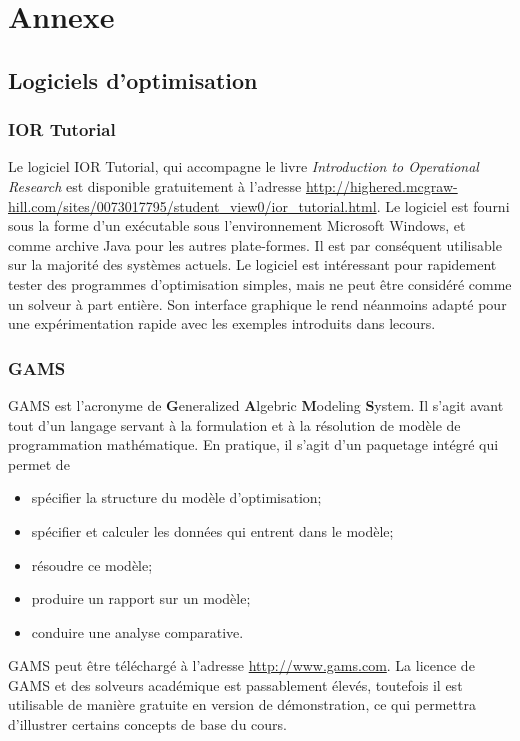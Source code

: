 \chapter{Annexe}

\section{Logiciels d'optimisation}

\subsection{IOR Tutorial}

Le logiciel IOR Tutorial, qui accompagne le livre {\sl Introduction to Operational Research} \citep{HillLieb01} est disponible gratuitement à l'adresse \url{http://highered.mcgraw-hill.com/sites/0073017795/student_view0/ior_tutorial.html}.
Le logiciel est fourni sous la forme d'un exécutable sous l'environnement Microsoft Windows, et comme archive Java pour les autres plate-formes.
Il est par conséquent utilisable sur la majorité des systèmes actuels.
Le logiciel est intéressant pour rapidement tester des programmes d'optimisation simples, mais ne peut être considéré comme un solveur à part entière.
Son interface graphique le rend néanmoins adapté pour une expérimentation rapide avec les exemples introduits dans lecours.

\subsection{GAMS}


GAMS est l'acronyme de {\bf G}eneralized {\bf A}lgebric {\bf M}odeling {\bf S}ystem.
Il s'agit avant tout d'un langage servant à la formulation et à la résolution de modèle de programmation mathématique.
En pratique, il s'agit d'un paquetage intégré qui permet de
\begin{itemize}
\item
spécifier la structure du modèle d'optimisation;
\item
spécifier et calculer les données qui entrent dans le modèle;
\item
résoudre ce modèle;
\item
produire un rapport sur un modèle;
\item
conduire une analyse comparative.
\end{itemize}
GAMS peut être téléchargé à l'adresse \url{http://www.gams.com}.
La licence de GAMS et des solveurs académique est passablement élevés, toutefois il est utilisable de manière gratuite en version de démonstration, ce qui permettra d'illustrer certains concepts de base du cours.

